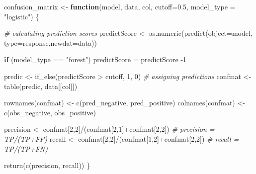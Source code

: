 \documentclass[
]{report}
\newenvironment{Shaded}{\begin{snugshade}}{\end{snugshade}}
\newcommand{\AttributeTok}[1]{\textcolor[rgb]{0.77,0.63,0.00}{#1}}
\newcommand{\CommentTok}[1]{\textcolor[rgb]{0.56,0.35,0.01}{\textit{#1}}}
\newcommand{\ControlFlowTok}[1]{\textcolor[rgb]{0.13,0.29,0.53}{\textbf{#1}}}
\newcommand{\DecValTok}[1]{\textcolor[rgb]{0.00,0.00,0.81}{#1}}
\newcommand{\FloatTok}[1]{\textcolor[rgb]{0.00,0.00,0.81}{#1}}
\newcommand{\FunctionTok}[1]{\textcolor[rgb]{0.00,0.00,0.00}{#1}}
\newcommand{\NormalTok}[1]{#1}
\newcommand{\OtherTok}[1]{\textcolor[rgb]{0.56,0.35,0.01}{#1}}
\newcommand{\SpecialCharTok}[1]{\textcolor[rgb]{0.00,0.00,0.00}{#1}}
\newcommand{\StringTok}[1]{\textcolor[rgb]{0.31,0.60,0.02}{#1}}
\begin{document}
\begin{Shaded}
\begin{Highlighting}[]
\NormalTok{confusion\_matrix }\OtherTok{\textless{}{-}} \ControlFlowTok{function}\NormalTok{(model, data, col, }\AttributeTok{cutoff=}\FloatTok{0.5}\NormalTok{, }\AttributeTok{model\_type =} \StringTok{"logistic"}\NormalTok{) \{}
  
  \CommentTok{\# calculating prediction scores}
\NormalTok{  predictScore }\OtherTok{\textless{}{-}} \FunctionTok{as.numeric}\NormalTok{(}\FunctionTok{predict}\NormalTok{(}\AttributeTok{object=}\NormalTok{model, }\AttributeTok{type=}\StringTok{\textquotesingle{}response\textquotesingle{}}\NormalTok{,}\AttributeTok{newdat=}\NormalTok{data)) }
  
  \ControlFlowTok{if}\NormalTok{ (model\_type }\SpecialCharTok{==} \StringTok{"forest"}\NormalTok{) predictScore }\OtherTok{=}\NormalTok{ predictScore }\SpecialCharTok{{-}}\DecValTok{1}
  
\NormalTok{  predic }\OtherTok{\textless{}{-}} \FunctionTok{if\_else}\NormalTok{(predictScore }\SpecialCharTok{\textgreater{}}\NormalTok{ cutoff, }\DecValTok{1}\NormalTok{, }\DecValTok{0}\NormalTok{) }\CommentTok{\# assigning predictions}
\NormalTok{  confmat }\OtherTok{\textless{}{-}} \FunctionTok{table}\NormalTok{(predic, data[[col]])}
  
  \FunctionTok{rownames}\NormalTok{(confmat) }\OtherTok{\textless{}{-}} \FunctionTok{c}\NormalTok{(}\StringTok{\textquotesingle{}pred\_negative\textquotesingle{}}\NormalTok{, }\StringTok{\textquotesingle{}pred\_positive\textquotesingle{}}\NormalTok{)}
  \FunctionTok{colnames}\NormalTok{(confmat) }\OtherTok{\textless{}{-}} \FunctionTok{c}\NormalTok{(}\StringTok{\textquotesingle{}obs\_negative\textquotesingle{}}\NormalTok{, }\StringTok{\textquotesingle{}obs\_positive\textquotesingle{}}\NormalTok{)}
  
\NormalTok{  precision }\OtherTok{\textless{}{-}}\NormalTok{ confmat[}\DecValTok{2}\NormalTok{,}\DecValTok{2}\NormalTok{]}\SpecialCharTok{/}\NormalTok{(confmat[}\DecValTok{2}\NormalTok{,}\DecValTok{1}\NormalTok{]}\SpecialCharTok{+}\NormalTok{confmat[}\DecValTok{2}\NormalTok{,}\DecValTok{2}\NormalTok{]) }\CommentTok{\# precision = TP/(TP+FP)}
\NormalTok{  recall }\OtherTok{\textless{}{-}}\NormalTok{ confmat[}\DecValTok{2}\NormalTok{,}\DecValTok{2}\NormalTok{]}\SpecialCharTok{/}\NormalTok{(confmat[}\DecValTok{1}\NormalTok{,}\DecValTok{2}\NormalTok{]}\SpecialCharTok{+}\NormalTok{confmat[}\DecValTok{2}\NormalTok{,}\DecValTok{2}\NormalTok{]) }\CommentTok{\# recall = TP/(TP+FN)}
  
  \FunctionTok{return}\NormalTok{(}\FunctionTok{c}\NormalTok{(precision, recall))}
\NormalTok{\}}
\end{Highlighting}
\end{Shaded}
\end{document}

